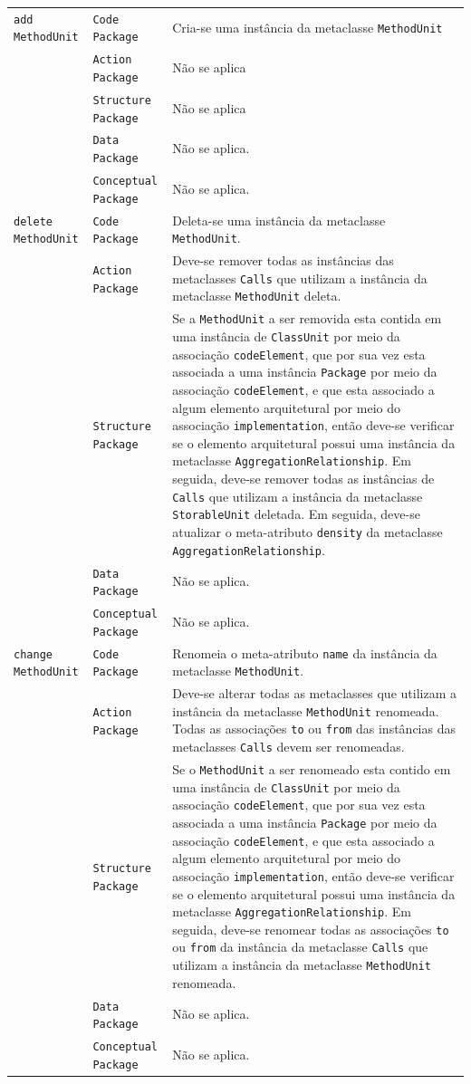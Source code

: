 \begin{longtable}{ | m{1.9cm} | m{3.57cm}| m{9.3cm} | }
 \texttt{add} \texttt{MethodUnit} & \texttt{Code Package} & Cria-se uma instância da metaclasse \texttt{MethodUnit}\tabularnewline
\cline{2-3} 
\cline{2-3} 
 & \texttt{Action Package} & Não se aplica \tabularnewline
 \cline{2-3} 
 & \texttt{Structure Package} & Não se aplica \tabularnewline
\cline{2-3} 
 & \texttt{Data Package} & Não se aplica. \tabularnewline
\cline{2-3} 
 & \texttt{Conceptual Package} & Não se aplica. \tabularnewline
\hline 
 \texttt{delete} \texttt{MethodUnit} & \texttt{Code Package} & Deleta-se uma instância da metaclasse \texttt{MethodUnit}.\tabularnewline
\cline{2-3} 
& \texttt{Action Package} & Deve-se remover todas as instâncias das metaclasses \texttt{Calls} que utilizam a instância da metaclasse \texttt{MethodUnit} deleta. \tabularnewline
\cline{2-3}
& \texttt{Structure Package} & Se a \texttt{MethodUnit} a ser removida esta contida em uma instância de \texttt{ClassUnit} por meio da associação \texttt{codeElement}, que por sua vez esta associada a uma instância \texttt{Package} por meio da associação \texttt{codeElement}, e que esta associado a algum elemento arquitetural por meio do associação \texttt{implementation}, então deve-se verificar se o elemento arquitetural possui uma instância da metaclasse \texttt{AggregationRelationship}. Em seguida, deve-se remover todas as instâncias de \texttt{Calls} que utilizam a instância da metaclasse \texttt{StorableUnit} deletada. Em seguida, deve-se atualizar o meta-atributo \texttt{density} da metaclasse \texttt{AggregationRelationship}. \tabularnewline
\cline{2-3}
& \texttt{Data Package} & Não se aplica. \tabularnewline
\cline{2-3}
& \texttt{Conceptual Package} & Não se aplica. \tabularnewline
\hline
\texttt{change} \texttt{MethodUnit} & \texttt{Code Package} & Renomeia o meta-atributo \texttt{name} da instância da metaclasse \texttt{MethodUnit}.\tabularnewline
\cline{2-3}
& \texttt{Action Package} & Deve-se alterar todas as metaclasses que utilizam a instância da metaclasse \texttt{MethodUnit} renomeada. Todas as associações \texttt{to} ou \texttt{from} das instâncias das metaclasses \texttt{Calls} devem ser renomeadas. \tabularnewline
\cline{2-3}
& \texttt{Structure Package} & Se o \texttt{MethodUnit} a ser renomeado esta contido em uma instância de \texttt{ClassUnit} por meio da associação \texttt{codeElement}, que por sua vez esta associada a uma instância \texttt{Package} por meio da associação \texttt{codeElement}, e que esta associado a algum elemento arquitetural por meio do associação \texttt{implementation}, então deve-se verificar se o elemento arquitetural possui uma instância da metaclasse \texttt{AggregationRelationship}. Em seguida, deve-se renomear todas as associações \texttt{to} ou \texttt{from} da instância da metaclasse \texttt{Calls} que utilizam a instância da metaclasse \texttt{MethodUnit} renomeada. \tabularnewline
\cline{2-3}
& \texttt{Data Package} & Não se aplica. \tabularnewline
\cline{2-3}
& \texttt{Conceptual Package} & Não se aplica. \tabularnewline
 \end{longtable}

